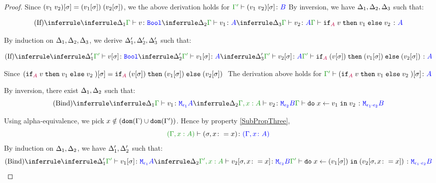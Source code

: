 \documentclass{report}
\begin{document}
\begin{framed}
\begin{proof}
            Since $(v_1\; v_2)[\sigma] = (v_1[\sigma])\;(v_2[\sigma])$, we the above derivation holds for $\typerelation{\G'}{(\apply{v_1}{v_2})\ssi}{B}$
        \case{\vif}
            By inversion, we have $\Delta_1,\Delta_2,\Delta_3$ such that:
        
            \begin{equation}
                \ntreeruleIII{\vif}{
                    \treeruleI{\D_1}{\typerelation{\G}{v}{\B}}
                    }{
                    \treeruleI{\D_2}{\typerelation{\G}{v_1}{ A}}
                    }{
                    \treeruleI{\D_3}{\typerelation{\G}{v_2}{ A}}
                }{
                    \typerelation{\G}{\pifthenelse{A}{v}{v_1}{v_2}}{ A}
                }
            \end{equation}
        
            By induction on $\Delta_1,\Delta_2, \Delta_3$, we derive 
            $\Delta_1', \Delta_2',\Delta_3'$ such that:
            
            \begin{equation}
                \ntreeruleIII{\vif}{
                    \treeruleI{\D_1'}{\typerelation{\G'}{v\ssi}{\B}}
                    }{
                    \treeruleI{\D_2'}{\typerelation{\G'}{v_1\ssi}{ A}}
                    }{
                    \treeruleI{\D_3'}{\typerelation{\G'}{v_2\ssi}{ A}}
                }{
                    \typerelation{\G'}{\pifthenelse{A}{(v\ssi)}{(v_1\ssi)}{(v_2\ssi)}}{ A}
                }
            \end{equation}
        
            Since $(\texttt{if}_{\textcolor{purple}{A}}\; v\; \texttt{then}\; v_1 \;\texttt{else} \; v_2\;)[\sigma] = \texttt{if}_{\textcolor{purple}{A}}\;(v[\sigma])\; \texttt{then}\; (v_1[\sigma]) \;\texttt{else} \;(v_2[\sigma])\;$ The derivation above holds for $\typerelation{\G'}{(\pifthenelse{A}{v}{v_1}{v_2})\ssi}{ A}$
        
        \case{\vbind}
            By inversion, there exist $\Delta_1, \Delta_2$ such that:
            \begin{equation}
                \ntreeruleII{\vbind}{
                    \treeruleI{\D_1}{\typerelation{\G}{v_1}{\M{\e_1}{A}}}
                    }{
                    \treeruleI{\D_2}{\typerelation{\G, x:A}{v_2}{\M{\e_2}{B}}}
                }{\typerelation{\G}{\doin{x}{v_1}{v_2}}{\M{\e_1\dot\e_2}{B}}}
            \end{equation}
        
            Using alpha-equivalence, we pick $x\notin(\texttt{dom}(\Gamma)\cup\texttt{dom}(\Gamma'))$. Hence by property \ref{SubPropThree}, $$\typerelation{(\G, x: A)}{(\si, x\setto x)}{(\gax)}$$
            By induction on $\Delta_1, \Delta_2$, we have $\Delta_1', \Delta_2'$ such that:
            \begin{equation}
                \ntreeruleII{\vbind}{
                    \treeruleI{\D_1'}{\typerelation{\G'}{v_1\ssi}{\M{\e_1}{A}}}
                    }{
                    \treeruleI{\D_2}{\typerelation{\G', x:A}{v_2\sub{\si, x\setto x}}{\M{\e_2}{B}}}
                }{\typerelation{\G'}{\doin{x}{(v_1\ssi)}{(v_2\sub{\si, x\setto x})}}{\M{\e_1\dot\e_2}{B}}}
            \end{equation}
        

\end{proof}
\end{framed}
\end{document}

